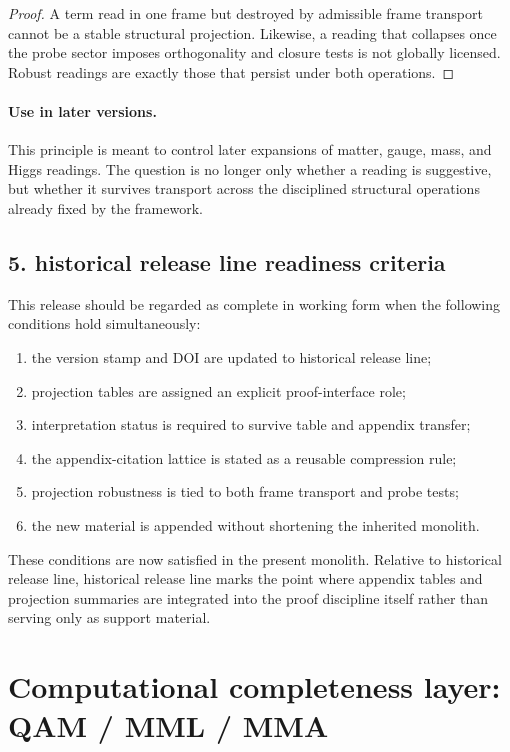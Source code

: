 \documentclass[12pt,a4paper]{article}
\DeclareRobustCommand{\QSCver}[1]{archival stage}
\renewcommand{\QSCver}[1]{historical release line}
\begin{document}
\begin{proof}
A term read in one frame but destroyed by admissible frame transport cannot be a
stable structural projection. Likewise, a reading that collapses once the probe
sector imposes orthogonality and closure tests is not globally licensed. Robust
readings are exactly those that persist under both operations.
\end{proof}

\paragraph{Use in later versions.}
This principle is meant to control later expansions of matter, gauge, mass, and
Higgs readings. The question is no longer only whether a reading is suggestive,
but whether it survives transport across the disciplined structural operations
already fixed by the framework.

\subsection*{5. \QSCver{v1.5.0} readiness criteria}
This release should be regarded as complete in working form when the following
conditions hold simultaneously:
\begin{enumerate}[leftmargin=2em]
 \item the version stamp and DOI are updated to \QSCver{v1.5.0};
 \item projection tables are assigned an explicit proof-interface role;
 \item interpretation status is required to survive table and appendix transfer;
 \item the appendix-citation lattice is stated as a reusable compression rule;
 \item projection robustness is tied to both frame transport and probe tests;
 \item the new material is appended without shortening the inherited monolith.
\end{enumerate}

These conditions are now satisfied in the present monolith. Relative to \QSCver{v1.4.0},
\QSCver{v1.5.0} marks the point where appendix tables and projection summaries are
integrated into the proof discipline itself rather than serving only as support
material.

\clearpage
\clearpage


\clearpage
\section*{Computational completeness layer: QAM / MML / MMA}
\end{document}

